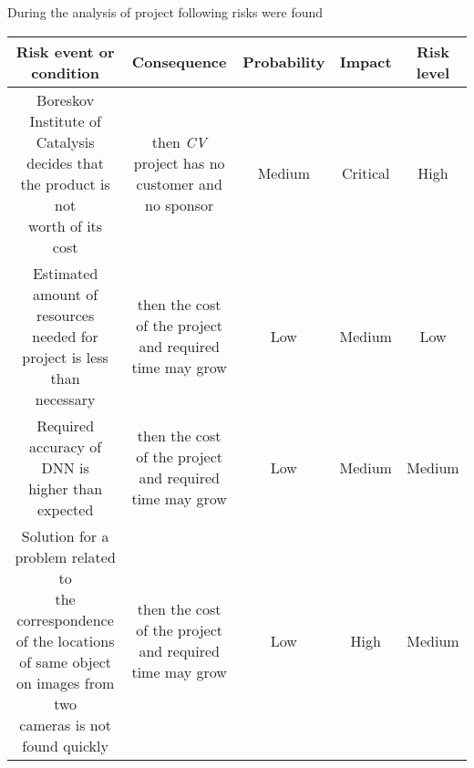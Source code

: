 During the analysis of project following risks were found
\\

\begin{tabular}{ | c | c | c | c | c | }
	\hline
	Risk event or condition & Consequence & Probability & Impact & Risk level \\ \hline
	\specialcell{Boreskov Institute of Catalysis\\decides that the product is not \\worth of its cost} & \specialcell{then \textit{CV} project has no\\customer and no sponsor} & Medium & Critical & High \\ \hline
	\specialcell{Estimated amount of resources\\needed for project is less than\\necessary} & \specialcell{then the cost of the project\\and required time may grow} & Low & Medium & Low \\ \hline
	\specialcell{Required accuracy of DNN is\\higher than expected} & \specialcell{then the cost of the project\\and required time may grow} & Low & Medium & Medium \\ \hline
	\specialcell{Solution for a problem related to\\the correspondence of the locations\\of same object on images from two\\cameras is not found quickly} & \specialcell{then the cost of the project\\and required time may grow} & Low & High & Medium \\ \hline
\end{tabular}
